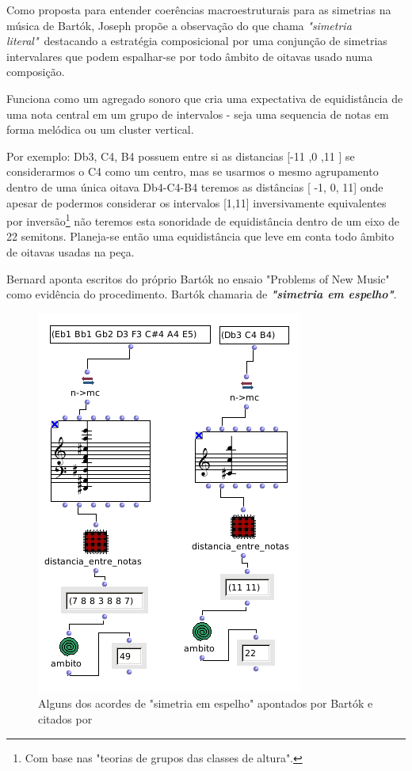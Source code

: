 \documentclass[
	12pt,				%
	openright,			%
	twoside,			%
	a4paper,			%
	english,			%
	french,				%
	spanish,			%
	brazil				%
	]{abntex2}
\begin{document}
Como proposta para entender coerências macroestruturais para as simetrias na música de Bartók, Joseph  propõe a observação do que chama \textit{"simetria literal"}\ destacando a estratégia composicional por uma conjunção de simetrias intervalares que podem espalhar-se por todo âmbito de oitavas usado numa composição.  

Funciona como um  agregado sonoro que cria uma expectativa de equidistância de uma nota central em um grupo de intervalos - seja uma sequencia de notas em forma melódica ou um cluster vertical. 

Por exemplo: { Db3, C4, B4} possuem entre si as distancias [-11 ,0 ,11 ] se considerarmos o C4 como um centro, mas se usarmos o mesmo agrupamento dentro de uma única oitava {Db4-C4-B4} teremos as distâncias [ -1, 0, 11] onde apesar de podermos considerar os intervalos [1,11] inversivamente equivalentes por inversão\footnote{Com base nas "teorias de grupos das classes de altura".} não teremos esta sonoridade de equidistância dentro de um eixo de 22 semitons. Planeja-se então uma equidistância que leve em conta todo âmbito de oitavas usadas na peça.

Bernard aponta escritos do próprio Bartók no ensaio "Problems of New Music" como evidência do procedimento. Bartók chamaria de \textit{\textbf{"simetria em espelho"}}.


\begin{figure}[!h]
	\caption{\label{fig_grafico} Alguns dos acordes de "simetria em espelho" apontados por Bartók e citados por }
	\begin{center}
	    \includegraphics[scale=0.5]{axis/simetria_literal.png}
	\end{center}
\end{figure}
\end{document}
